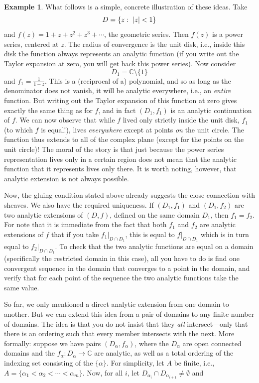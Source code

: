 \documentclass[a4paper]{book}
\DeclarePairedDelimiter{\abs}{\lvert}{\rvert}
\theoremstyle{definition}
\newtheorem{example}{Example}[section]
\theoremstyle{definition}
\theoremstyle{definition}
\theoremstyle{theorem}
\theoremstyle{definition}
\begin{document}
\begin{example}
	What follows is a simple, concrete illustration of these ideas. Take 
	\begin{equation*} 
	D = \{z : \hspace*{0.3em} \abs*{z} < 1\}
	\end{equation*} 
	and $f(z) = 1 + z + z^2+ z^3 + \cdots$, the geometric series. Then $f(z)$ is a power series, centered at $z$. The radius of convergence is the unit disk, i.e., inside this disk the function always represents an analytic function (if you write out the Taylor expansion at zero, you will get back this power series). Now consider 
	\begin{equation*} 
	D_1 = \mathbb{C}\setminus \{1\} 
	\end{equation*} 
	and $f_1 = \frac{1}{1-z}$. This is a (reciprocal of a) polynomial, and so as long as the denominator does not vanish, it will be analytic everywhere, i.e., an \textit{entire} function. But writing out the Taylor expansion of this function at zero gives exactly the same thing as for $f$, and in fact $(D_1, f_1)$ is an analytic continuation of $f$. We can now observe that while $f$ lived only strictly inside the unit disk, $f_1$ (to which $f$ is equal!), lives \textit{everywhere} except at points \textit{on} the unit circle. The function thus extends to all of the complex plane (except for the points on the unit circle)! The moral of the story is that just because the power series representation lives only in a certain region does not mean that the analytic function that it represents lives only there. It is worth noting, however, that analytic extension is not always possible.\par 
	Now, the gluing condition stated above already suggests the close connection with sheaves. We also have the required uniqueness. If $(D_1, f_1)$ and $(D_1, f_2)$ are two analytic extensions of $(D, f)$, defined on the same domain $D_1$, then $f_1 = f_2$. For note that it is immediate from the fact that both $f_1$ and $f_2$ are analytic extensions of $f$ that if you take $f_1|_{D \cap D_1}$, this is equal to $f|_{D \cap D_1}$ which is in turn equal to $f_2|_{D \cap D_1}$. To check that the two analytic functions are equal on a domain (specifically the restricted domain in this case), all you have to do is find one convergent sequence in the domain that converges to a point in the domain, and verify that for each point of the sequence the two analytic functions take the same value.\par 
	So far, we only mentioned a direct analytic extension from one domain to another. But we can extend this idea from a pair of domains to any finite number of domains. The idea is that you do not insist that they \textit{all} intersect---only that there is an ordering such that every member intersects with the next. More formally: suppose we have pairs $(D_{\alpha}, f_{\alpha})$, where the $D_{\alpha}$ are open connected domains and the $f_{\alpha}: D_{\alpha} \rightarrow \mathbb{C}$ are analytic, as well as a total ordering of the indexing set consisting of the $\{\alpha\}$. For simplicity, let $A$ be finite, i.e., $A = \{\alpha_1 < \alpha_2 < \cdots < \alpha_m\}$. Now, for all $i$, let $D_{\alpha_i} \cap D_{\alpha_{i+1}} \neq \emptyset$ and 

\end{example}
\end{document}
